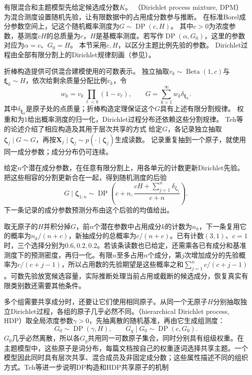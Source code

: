 有限混合和主题模型先给定候选成分数$K$。
（Dirichlet process mixture, DPM）为混合测度设置随机先验，让有限数据中的占用成分数参与推断。
在标准Borel成分参数空间上，记这个随机概率测度为$G\sim\operatorname{DP}(c,H)$。
其中$c>0$为浓度参数，基测度$cH$的总质量为$c$，$H$是基概率测度。若写作$\operatorname{DP}(\alpha,G_0)$，这里的参数对应为$\alpha=c$、$G_0=H$。
本节采用$c,H$，以区分主题比例先验的参数。
Dirichlet过程由全部有限分割上的Dirichlet规律刻画（参见）。


折棒构造提供可供混合建模使用的可数表示。
独立抽取$v_k\sim\operatorname{Beta}(1,c)$与$\bm\xi_k\sim H$，依次给剩余质量分配比例$v_k$，令
\[
  w_k=v_k\prod_{\ell<k}(1-v_\ell),\qquad
  G=\sum_{k=1}^{\infty}w_k\delta_{\bm{\xi}_k}.
\]
其中$\delta_{\bm\xi_k}$是原子处的点质量；折棒构造定理保证这个$G$具有上述有限分割规律。
权重和为$1$给出概率测度的归一化，Dirichlet过程分布还依赖这些分割规律。
Teh等的论述介绍了相应构造及其用于层次共享的方式
给定$G$，各记录独立抽取$\bm\zeta_j\mid G\sim G$，再按$\bm X_j\mid\bm\zeta_j\sim p(\cdot\mid\bm\zeta_j)$生成读数。
记录重复抽到一个原子，就使用同一成分参数；成分分布仍可连续。

给定$n$个潜在成分参数，在任意有限分割上，用各单元的计数更新Dirichlet先验。
把这些相容的分割更新合在一起，得到随机测度的后验
\[
  G\mid\bm\zeta_{1:n}\sim\operatorname{DP}
    \left(c+n,\frac{cH+\sum_{j=1}^n\delta_{\bm\zeta_j}}{c+n}\right).
\]
下一条记录的成分参数预测分布由这个后验的均值给出。

取无原子的$H$并积分掉$G$，前$n$个潜在参数中占用成分$k$的计数为$n_k$，下一条复用它的概率为$n_k/(n+c)$，新抽成分的总概率为$c/(n+c)$。已有计数$(3,1)$、$c=1$时，三个选择分别为$0.6,0.2,0.2$。若该条读数也已给定，还需乘各已有成分和基准测度下的预测密度，再归一化。有限$n$至多占用$n$个成分，第$j$次增加成分的先验概率为$c/(c+j-1)$，所以占用数的先验期望是这些概率之和$\sum_{j=1}^n c/(c+j-1)$。可数先验放宽候选容量，实际推断处理当前占用或截断的候选成分，恢复真实有限类别数还需要其他条件。

多个组需要共享成分时，还要让它们使用相同原子。从同一个无原子$H$分别抽取独立Dirichlet过程，各组的原子几乎必然不同。（hierarchical Dirichlet process, HDP）取全局浓度参数$\gamma>0$，先抽离散的随机基准，再由它生成组测度：
\begin{equation}
  \label{eq:pgm-static-directed-hdp}
  G_0\sim\operatorname{DP}(\gamma,H),\qquad
  G_g\mid G_0\sim\operatorname{DP}(c,G_0).
\end{equation}
$G_0$几乎必然离散，所以各$G_g$共用同一可数原子集合，同时分别具有组级权重。在主题模型中，这些原子是词分布，每篇文档按自己的权重逐词选择共享主题。一个模型因此同时具有层次共享、混合成员及非固定成分数；这些属性描述不同的组织方式。Teh等进一步说明DP构造和HDP共享原子的机制

